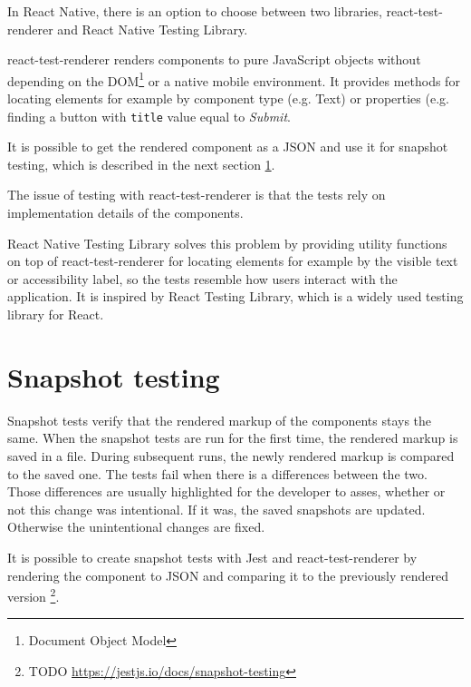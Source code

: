 \documentclass[
  digital, %
  table,   %
  oneside, %
  lof,     %
  lot,     %
]{fithesis3}
\begin{document}
In React Native, there is an option to choose between two libraries, react-test-renderer and React Native Testing Library. 

react-test-renderer renders components to pure JavaScript objects without depending on the DOM\footnote{Document Object Model} or a native mobile environment. It provides methods for locating elements for example by component type (e.g. Text) or properties (e.g. finding a button with \texttt{title} value equal to \textit{Submit}.

It is possible to get the rendered component as a JSON and use it for snapshot testing, which is described in the next section \ref{sect:snapshot_testing}.

The issue of testing with react-test-renderer is that the tests rely on implementation details of the components.

React Native Testing Library solves this problem by providing utility functions on top of react-test-renderer for locating elements for example by the visible text or accessibility label, so the tests resemble how users interact with the application. It is inspired by React Testing Library, which is a widely used testing library for React. \cite{TODO}


\section{Snapshot testing}
\label{sect:snapshot_testing}
Snapshot tests verify that the rendered markup of the components stays the same. When the snapshot tests are run for the first time, the rendered markup is saved in a file.
During subsequent runs, the newly rendered markup is compared to the saved one. The tests fail when there is a differences between the two. Those differences are usually highlighted for the developer to asses, whether or not this change was intentional. If it was, the saved snapshots are updated. Otherwise the unintentional changes are fixed.

It is possible to create snapshot tests with Jest and react-test-renderer by rendering the component to JSON and comparing it to the previously rendered version \footnote{TODO \url{https://jestjs.io/docs/snapshot-testing}}.
\end{document}
